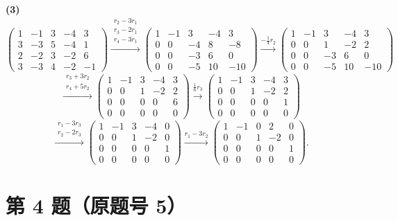 \documentclass[11pt,a4paper]{ctexart}
\newcommand{\rt}[1]{\xrightarrow{#1}}
\begin{document}
\textbf{(3)}
\[
\begin{pmatrix}1&-1&3&-4&3\\3&-3&5&-4&1\\2&-2&3&-2&6\\3&-3&4&-2&-1\end{pmatrix}
\rt{\substack{r_2-3r_1\\ r_3-2r_1\\ r_4-3r_1}}
\begin{pmatrix}1&-1&3&-4&3\\0&0&-4&8&-8\\0&0&-3&6&0\\0&0&-5&10&-10\end{pmatrix}
\rt{-\frac14 r_2}
\begin{pmatrix}1&-1&3&-4&3\\0&0&1&-2&2\\0&0&-3&6&0\\0&0&-5&10&-10\end{pmatrix}
\]
\[
\rt{\substack{r_3+3r_2\\ r_4+5r_2}}
\begin{pmatrix}1&-1&3&-4&3\\0&0&1&-2&2\\0&0&0&0&6\\0&0&0&0&0\end{pmatrix}
\rt{\frac16 r_3}
\begin{pmatrix}1&-1&3&-4&3\\0&0&1&-2&2\\0&0&0&0&1\\0&0&0&0&0\end{pmatrix}
\]
\[
\rt{\substack{r_1-3r_3\\ r_2-2r_3}}
\begin{pmatrix}1&-1&3&-4&0\\0&0&1&-2&0\\0&0&0&0&1\\0&0&0&0&0\end{pmatrix}
\rt{r_1-3r_2}
\begin{pmatrix}1&-1&0&2&0\\0&0&1&-2&0\\0&0&0&0&1\\0&0&0&0&0\end{pmatrix}.
\]

\section*{第 4 题（原题号 5）}
\end{document}
